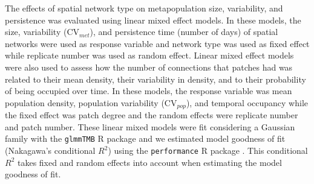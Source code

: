 
The effects of spatial network type on metapopulation size, variability, and persistence was evaluated using linear mixed effect models. In these models, the size, variability (CV$_{met}$), and persistence time (number of days) of spatial networks were used as response variable and network type was used as fixed effect while replicate number was used as random effect. Linear mixed effect models were also used to assess how the number of connections that patches had was related to their mean density, their variability in density, and to their probability of being occupied over time.  In these models, the response variable was mean population density, population variability (CV$_{pop}$), and temporal occupancy while the fixed effect was patch degree and the random effects were replicate number and patch number. These linear mixed models were fit considering a Gaussian family with the \texttt{glmmTMB} R package \parencite{brooks2017} and we estimated model goodness of fit (Nakagawa's conditional $R^2$) using the \texttt{performance} R package \parencite{ludecke2021}. This conditional $R^2$ takes fixed and random effects into account when estimating the model goodness of fit. 



